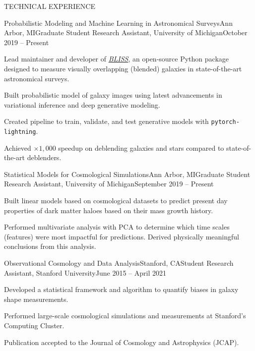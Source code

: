 \documentclass{resume} %
\newcommand{\pl}[0]{\texttt{pytorch-lightning}}
\begin{document}
\begin{rSection}{TECHNICAL EXPERIENCE}

\begin{rSubsection}{Probabilistic Modeling and Machine Learning in Astronomical Surveys}{Ann Arbor, MI}{Graduate Student Research Assistant, University of Michigan}{October 2019 -- Present}
\item Lead maintainer and developer of \textit{\href{https://github.com/prob-ml/bliss}{BLISS}}, an open-source Python package designed to measure visually overlapping (blended) galaxies in state-of-the-art astronomical surveys.
\item Built probabilistic model of galaxy images using latest advancements in variational inference and deep generative modeling.
\item Created pipeline to train, validate, and test generative models with \pl.
\item\textbf{} Achieved $\times 1,000$ speedup on deblending galaxies and stars compared to state-of-the-art deblenders.
\end{rSubsection}

\begin{rSubsection}{Statistical Models for Cosmological Simulations}{Ann Arbor, MI}{Graduate Student Research Assistant, University of Michigan}{September 2019 -- Present}
\item Built linear models based on cosmological datasets to predict present day properties of dark matter haloes based on their mass growth history. 
\item Performed multivariate analysis with PCA to determine which time scales (features) were most impactful for predictions. Derived physically meaningful conclusions from this analysis.
\end{rSubsection}

\begin{rSubsection}{Observational Cosmology and Data Analysis}{Stanford, CA}{Student Research Assistant, Stanford University}{June 2015 -- April 2021}

\item Developed a statistical framework and algorithm to quantify biases in galaxy shape measurements.
\item Performed large-scale cosmological simulations and measurements at Stanford's Computing Cluster.
\item Publication accepted to the Journal of Cosmology and Astrophysics (JCAP). 
\end{rSubsection}


\end{rSection}
\end{document}
